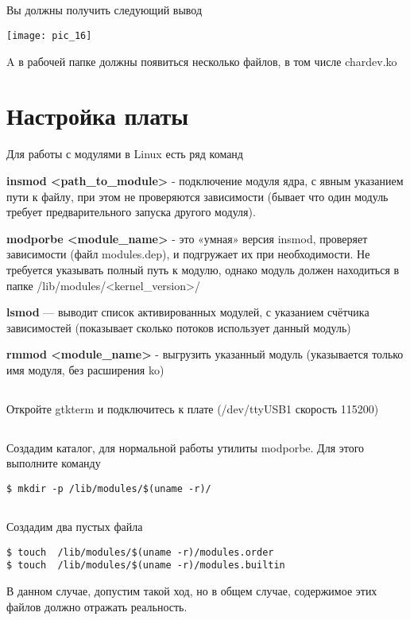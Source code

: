 \subsection{}Вы должны получить следующий вывод
\begin{center}
	\texttt{[image: pic\_16]}
\end{center}
A в рабочей папке должны появиться несколько файлов, в том числе chardev.ko

\section{Настройка платы}
Для работы с модулями в Linux есть ряд команд

\textbf{insmod <path\_to\_module>} - подключение модуля ядра, с явным указанием пути к файлу, при этом не проверяются зависимости (бывает что один модуль требует предварительного запуска другого модуля).

\textbf{modporbe <module\_name>} - это «умная» версия insmod, проверяет зависимости (файл modules.dep), и подгружает их при необходимости. Не требуется указывать полный путь к модулю, однако модуль должен находиться в папке  /lib/modules/<kernel\_version>/

\textbf{lsmod} — выводит список активированных модулей, с указанием счётчика зависимостей (показывает сколько потоков использует данный модуль)

\textbf{rmmod <module\_name>} - выгрузить указанный модуль (указывается только имя модуля, без расширения ko)

\subsection{}Откройте gtkterm и подключитесь к плате (/dev/ttyUSB1 скорость 115200)

\subsection{}Создадим каталог, для нормальной работы утилиты modporbe. Для этого выполните команду
\begin{lstlisting}[style=bash]
$ mkdir -p /lib/modules/$(uname -r)/
\end{lstlisting}

\subsection{}Создадим два пустых файла
\begin{lstlisting}[style=bash]
$ touch  /lib/modules/$(uname -r)/modules.order
$ touch  /lib/modules/$(uname -r)/modules.builtin
\end{lstlisting}
В данном случае, допустим такой ход, но в общем случае, содержимое этих файлов должно отражать реальность.

